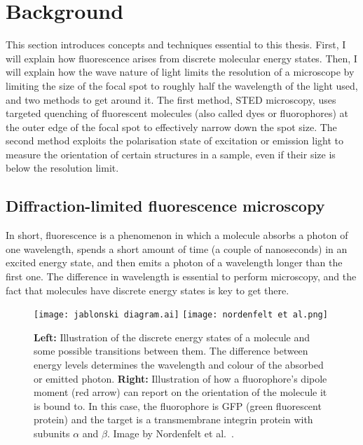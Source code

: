 \chapter{Background}

This section introduces concepts and techniques essential to this thesis. First, I will explain how fluorescence arises from discrete molecular energy states. Then, I will explain how the wave nature of light limits the resolution of a microscope by limiting the size of the focal spot to roughly half the wavelength of the light used, and two methods to get around it. The first method, STED microscopy, uses targeted quenching of fluorescent molecules (also called dyes or fluorophores) at the outer edge of the focal spot to effectively narrow down the spot size. The second method exploits the polarisation state of excitation or emission light to measure the orientation of certain structures in a sample, even if their size is below the resolution limit.

\section{Diffraction-limited fluorescence microscopy}

In short, fluorescence is a phenomenon in which a molecule absorbs a photon of one wavelength, spends a short amount of time (a couple of nanoseconds) in an excited energy state, and then emits a photon of a wavelength longer than the first one. The difference in wavelength is essential to perform microscopy, and the fact that molecules have discrete energy states is key to get there.

\begin{figure}
	\centering
	\texttt{[image: jablonski diagram.ai]} \hfill \texttt{[image: nordenfelt et al.png]}
	\caption{
		\textbf{Left:} Illustration of the discrete energy states of a molecule and some possible transitions between them. The difference between energy levels determines the wavelength and colour of the absorbed or emitted photon. \textbf{Right:} Illustration of how a fluorophore's dipole moment (red arrow) can report on the orientation of the molecule it is bound to. In this case, the fluorophore is GFP (green fluorescent protein) and the target is a transmembrane integrin protein with subunits $ \alpha $ and $ \beta $. Image by Nordenfelt et al.~\cite{Nordenfelt2017}.
	}
	\label{fig:jablonski}
\end{figure}

